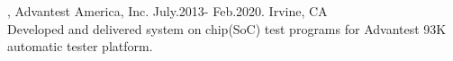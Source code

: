 \documentclass[11pt]{article} %
\begin{document}
, Advantest America, Inc. July.2013- Feb.2020. Irvine, CA\\
\noindent Developed and delivered system on chip(SoC) test programs for Advantest 93K automatic tester platform.\\ 
\vspace{-1mm}
\end{document}
